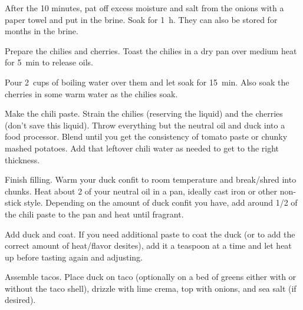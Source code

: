 \begin{recipe}
{		\step After the 10 minutes, pat off excess moisture and salt from the onions with a paper towel and put in the brine. Soak for \SI{1}{\hour}. They can also be stored for months in the brine.

		\step Prepare the chilies and cherries. Toast the chilies in a dry pan over medium heat for \SI{5}{\minute} to release oils.

		\step Pour \SI{2}{cups} of boiling water over them and let soak for \SI{15}{\minute}. Also soak the cherries in some warm water as the chilies soak.

		\step Make the chili paste. Strain the chilies (reserving the liquid) and the cherries (don't save this liquid). Throw everything but the neutral oil and duck into a food processor. Blend until you get the consistency of tomato paste or chunky mashed potatoes. Add that leftover chili water as needed to get to the right thickness.

		\step Finish filling. Warm your duck confit to room temperature and break/shred into chunks. Heat about \SI{2}{\tablespoon} of your neutral oil in a pan, ideally cast iron or other non-stick style. Depending on the amount of duck confit you have, add around \SI{1/2}{\cup} of the chili paste to the pan and heat until fragrant.

		\step Add duck and coat. If you need additional paste to coat the duck (or to add the correct amount of heat/flavor desites), add it a teaspoon at a time and let heat up before tasting again and adjusting.

		\step Assemble tacos. Place duck on taco (optionally on a bed of greens either with or without the taco shell), drizzle with lime crema, top with onions, and sea salt (if desired).
	}

\end{recipe}
